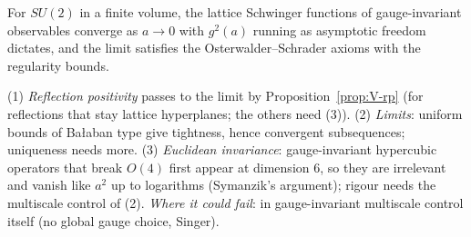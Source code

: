 \begin{conjecture}\label{conj:V-uv}
For $SU(2)$ in a finite volume, the lattice Schwinger functions of gauge-invariant observables converge as $a\to0$
with $g^2(a)$ running as asymptotic freedom dictates, and the limit satisfies the Osterwalder--Schrader axioms with
the regularity bounds.
\end{conjecture}
\begin{sketch}
(1) \emph{Reflection positivity} passes to the limit by Proposition~\ref{prop:V-rp} (for reflections that stay
lattice hyperplanes; the others need (3)). (2) \emph{Limits}: uniform
bounds of Ba{\l}aban type give tightness, hence convergent subsequences; uniqueness needs more. (3) \emph{Euclidean
invariance}: gauge-invariant hypercubic operators that break $O(4)$ first appear at dimension 6, so they are irrelevant
and vanish like $a^2$ up to logarithms (Symanzik's argument); rigour needs the multiscale control of (2).
\emph{Where it could fail}: in gauge-invariant multiscale control itself (no global gauge choice, Singer).
\end{sketch}

\medskip{}


